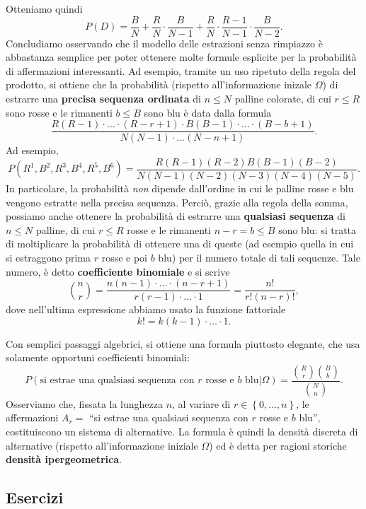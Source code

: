 \documentclass[
  italian,
  letterpaper,
]{book}
\newcommand{\cur}[1]{\left\{ #1 \right\}}
\theoremstyle{definition}
\theoremstyle{remark}
\begin{document}
Otteniamo quindi
\[ P(D ) = \frac B N + \frac{R} N \cdot \frac {B}{N-1} + \frac R N \cdot \frac {R-1}{N-1}\cdot \frac{B}{N-2}.\]
Concludiamo osservando che il modello delle estrazioni senza rimpiazzo è
abbastanza semplice per poter ottenere molte formule esplicite per la
probabilità di affermazioni interessanti. Ad esempio, tramite un uso
ripetuto della regola del prodotto, si ottiene che la probabilità
(rispetto all'informazione inizale \(\Omega\)) di estrarre una
\textbf{precisa sequenza ordinata} di \(n \le N\) palline colorate, di
cui \(r \le R\) sono rosse e le rimanenti \(b \le B\) sono blu è data
dalla formula
\[ \frac{R(R-1)\cdot \ldots \cdot (R-r+1) \cdot B(B-1) \cdot \ldots \cdot  (B-b+1)}{N(N-1)\cdot \ldots (N-n+1)}.\]
Ad esempio,
\[ P( R^1, B^2, R^3, B^4, R^5, B^6 ) = \frac{ R(R-1)(R-2)B(B-1)(B-2)}{N(N-1)(N-2)(N-3)(N-4)(N-5)}.\]
In particolare, la probabilità \emph{non} dipende dall'ordine in cui le
palline rosse e blu vengono estratte nella precisa sequenza. Perciò,
grazie alla regola della somma, possiamo anche ottenere la probabilità
di estrarre una \textbf{qualsiasi sequenza} di \(n \le N\) palline, di
cui \(r \le R\) rosse e le rimanenti \(n-r=b \le B\) sono blu: si tratta
di moltiplicare la probabilità di ottenere una di queste (ad esempio
quella in cui si estraggono prima \(r\) rosse e poi \(b\) blu) per il
numero totale di tali sequenze. Tale numero, è detto
\textbf{coefficiente binomiale} e si scrive
\[ {n \choose r} = \frac{n(n-1) \cdot \ldots \cdot (n-r+1)}{r (r-1) \cdot\ldots  \cdot 1} = \frac{ n!}{r! (n-r)!},\]
dove nell'ultima espressione abbiamo usato la funzione fattoriale
\[ k! = k(k-1)\cdot \ldots \cdot 1.\]

Con semplici passaggi algebrici, si ottiene una formula piuttosto
elegante, che usa solamente opportuni coefficienti binomiali:
\[ P( \text{si estrae una qualsiasi sequenza con $r$ rosse e $b$ blu} | \Omega) = \frac{{R \choose r} {B \choose b}}{ {N \choose n}}.\]
Osserviamo che, fissata la lunghezza \(n\), al variare di
\(r \in \cur{0, \ldots, n}\), le affermazioni \(A_r =\) ``si estrae una
qualsiasi sequenza con \(r\) rosse e \(b\) blu'', costituiscono un
sistema di alternative. La formula è quindi la densità discreta di
alternative (rispetto all'informazione iniziale \(\Omega\)) ed è detta
per ragioni storiche \textbf{densità ipergeometrica}.

\subsection{Esercizi}\label{esercizi-4}
\end{document}
